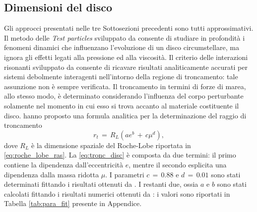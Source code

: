 \subsection{Dimensioni del disco}

Gli approcci presentati nelle tre Sottosezioni precedenti sono tutti approssimativi. Il metodo delle \textit{Test particles} sviluppato da \textcite{Pichardo2005} consente di studiare in profondità i fenomeni dinamici che influenzano l'evoluzione di un disco circumstellare, ma ignora gli effetti legati alla pressione ed alla viscosità.
Il criterio delle interazioni risonanti sviluppato da \textcite{GoldreichTremaine1980} consente di ricavare risultati analiticamente accurati per sistemi debolmente interagenti nell'intorno della regione di troncamento: tale assunzione non è sempre verificata.
Il troncamento in termini di forze di marea, allo stesso modo, è determinato considerando l'influenza del corpo perturbante solamente nel momento in cui esso si trova accanto al materiale costituente il disco. 
\textcite{ManaraTronc2019} hanno proposto una formula analitica per la determinazione del raggio di troncamento 
\begin{equation}
r_t\,=\,R_{L} (a e^b\,+\,c\mu^d),
\label{eq:tronc_disc}
\end{equation}
dove $R_L$ è la dimensione spaziale del Roche-Lobe riportata in \eqref{eq:roche_lobe_ras}. La \eqref{eq:tronc_disc} è composta da due termini: il primo contiene la dipendenza dall'eccentricità $e$, mentre il secondo esplicita una dipendenza dalla massa ridotta $\mu$. 
I parametri $c\,=\,0.88$ e $d\,=\,0.01$ sono stati determinati fittando i risultati ottenuti da \textcite{PapaloizouPringle1977}.
I restanti due, ossia $a$ e $b$ sono stati calcolati fittando i risultati numerici ottenuti da \textcite{ArtymowiczLubow1994}: i valori sono riportati in Tabella \ref{tab:para_fit} presente in Appendice.